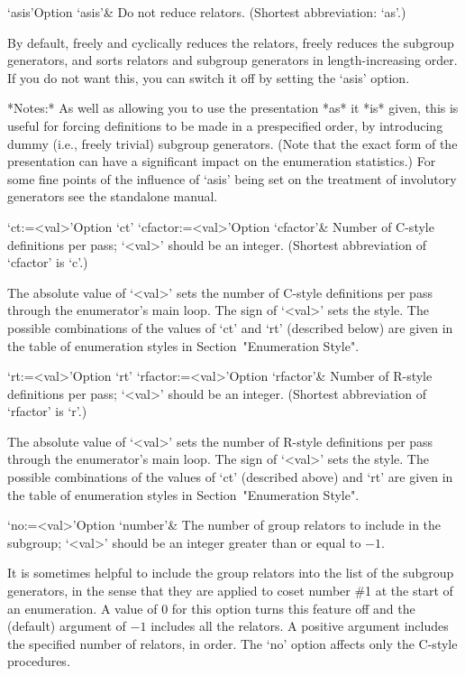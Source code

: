 \beginitems
\>`asis'{Option `asis'}&
Do not reduce relators. (Shortest abbreviation: `as'.)

By default, {\ACE} freely  and cyclically reduces the relators, freely
reduces  the  subgroup generators,  and  sorts  relators and  subgroup
generators in length-increasing  order.  If you do not  want this, you
can switch it off by setting the `asis' option.

*Notes:* As well as allowing you  to use the presentation *as* it *is*
given,  this  is  useful for  forcing  definitions  to  be made  in  a
prespecified  order,  by  introducing  dummy  (i.e.,  freely  trivial)
subgroup generators.   (Note that the  exact form of  the presentation
can  have a significant  impact on  the enumeration  statistics.)  For
some fine points of the influence of `asis' being set on the treatment
of involutory generators see the {\ACE} standalone manual.

\>`ct:=<val>'{Option `ct'}
\>`cfactor:=<val>'{Option `cfactor'}&
Number of C-style definitions per pass; `<val>' should be an  integer. 
(Shortest abbreviation of `cfactor' is `c'.)

The absolute value of `<val>' sets the
number of C-style definitions per  pass through  the enumerator's main
loop. The sign of `<val>'  sets the  style. The possible  combinations
of the values of `ct' and  `rt'  (described below)  are  given in  the
table of  enumeration styles in Section~"Enumeration Style".

\>`rt:=<val>'{Option `rt'}
\>`rfactor:=<val>'{Option `rfactor'}&
Number of R-style definitions per pass; `<val>' should be an  integer. 
(Shortest abbreviation of `rfactor' is `r'.)

The absolute value of `<val>' sets the
number of R-style definitions per  pass through  the enumerator's main
loop. The sign of `<val>'  sets the  style. The possible  combinations
of the values of `ct' (described above)  and  `rt'  are  given in  the
table of  enumeration styles in Section~"Enumeration Style".

\>`no:=<val>'{Option `number'}&
The number of group relators to include in the subgroup;  
`<val>' should be an integer greater than or equal to $-1$.

It is sometimes helpful to include the group relators into the list of
the subgroup generators,  in the sense that they  are applied to coset
number  \#1 at the  start of  an enumeration.  A value  of 0  for this
option  turns this  feature off  and  the (default)  argument of  $-1$
includes all the relators.  A positive argument includes the specified
number of relators, in order. The `no' option affects only the C-style
procedures.

